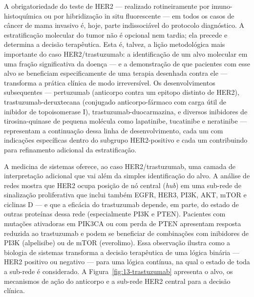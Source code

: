 A obrigatoriedade do teste de HER2 --- realizado rotineiramente por imuno-histoquímica ou por hibridização in situ fluorescente --- em todos os casos de câncer de mama invasivo é, hoje, parte indissociável do protocolo diagnóstico. A estratificação molecular do tumor não é opcional nem tardia; ela precede e determina a decisão terapêutica. Esta é, talvez, a lição metodológica mais importante do caso HER2/trastuzumab: a identificação de um alvo molecular em uma fração significativa da doença --- e a demonstração de que pacientes com esse alvo se beneficiam especificamente de uma terapia desenhada contra ele --- transforma a prática clínica de modo irreversível. Os desenvolvimentos subsequentes --- pertuzumab (anticorpo contra um epitopo distinto de HER2), trastuzumab-deruxtecana (conjugado anticorpo-fármaco com carga útil de inibidor de topoisomerase I), trastuzumab-duocarmazina, e diversos inibidores de tirosina-quinase de pequena molécula como lapatinibe, tucatinibe e neratinibe --- representam a continuação dessa linha de desenvolvimento, cada um com indicações específicas dentro do subgrupo HER2-positivo e cada um contribuindo para refinamento adicional da estratificação.

A medicina de sistemas oferece, ao caso HER2/trastuzumab, uma camada de interpretação adicional que vai além da simples identificação do alvo. A análise de redes mostra que HER2 ocupa posição de nó central (\emph{hub}) em uma sub-rede de sinalização proliferativa que inclui também EGFR, HER3, PI3K, AKT, mTOR e ciclinas D --- e que a eficácia do trastuzumab depende, em parte, do estado de outras proteínas dessa rede (especialmente PI3K e PTEN). Pacientes com mutações ativadoras em PIK3CA ou com perda de PTEN apresentam resposta reduzida ao trastuzumab e podem se beneficiar de combinações com inibidores de PI3K (alpelisibe) ou de mTOR (everolimo). Essa observação ilustra como a biologia de sistemas transforma a decisão terapêutica de uma lógica binária --- HER2 positivo ou negativo --- para uma lógica contínua, na qual o estado de toda a sub-rede é considerado. A Figura~\ref{fig:13-trastuzumab} apresenta o alvo, os mecanismos de ação do anticorpo e a sub-rede HER2 central para a decisão clínica.

